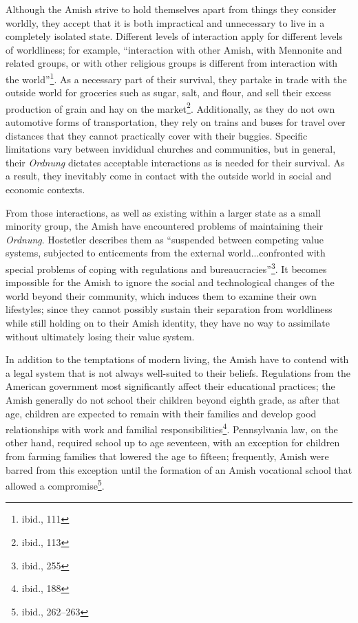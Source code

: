 Although the Amish strive to hold themselves apart from things they consider
worldly, they accept that it is both impractical and unnecessary to live in a
completely isolated state. Different levels of interaction apply for different
levels of worldliness; for example, ``interaction with other Amish, with
Mennonite and related groups, or with other religious groups is different from
interaction with the world''\footnote{ibid., 111}. As a necessary part of their
survival, they partake in trade with the outside world for groceries such as
sugar, salt, and flour, and sell their excess production of grain and hay on the
market\footnote{ibid., 113}. Additionally, as they do not own automotive forms
of transportation, they rely on trains and buses for travel over distances that
they cannot practically cover with their buggies. Specific limitations vary
between invididual churches and communities, but in general, their
\textit{Ordnung} dictates acceptable interactions as is needed for their
survival. As a result, they inevitably come in contact with the outside world in
social and economic contexts.

From those interactions, as well as existing within a larger state as a small
minority group, the Amish have encountered problems of maintaining their
\textit{Ordnung}. Hostetler describes them as ``suspended between competing
value systems, subjected to enticements from the external world...confronted
with special problems of coping with regulations and
bureaucracies''\footnote{ibid., 255}. It becomes impossible for the Amish to
ignore the social and technological changes of the world beyond their community,
which induces them to examine their own lifestyles; since they cannot possibly
sustain their separation from worldliness while still holding on to their Amish
identity, they have no way to assimilate without ultimately losing their value
system.

In addition to the temptations of modern living, the Amish have to contend with
a legal system that is not always well-suited to their beliefs. Regulations from
the American government most significantly affect their educational practices;
the Amish generally do not school their children beyond eighth grade, as after
that age, children are expected to remain with their families and develop good
relationships with work and familial responsibilities\footnote{ibid., 188}.
Pennsylvania law, on the other hand, required school up to age seventeen, with
an exception for children from farming families that lowered the age to fifteen;
frequently, Amish were barred from this exception until the formation of an
Amish vocational school that allowed a compromise\footnote{ibid., 262--263}.

